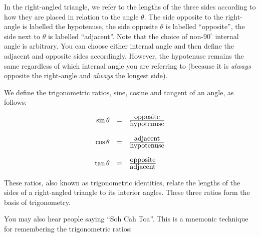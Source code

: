

In the right-angled triangle, we refer to the lengths of the three
sides according to how they are placed in relation to the angle
$\theta $. The side opposite to the right-angle is labelled the
hypotenuse, the side opposite $\theta $ is labelled ``opposite'', the
side next to $\theta $ is labelled ``adjacent''. Note that the choice
of non-$90^{\circ}$ internal angle is arbitrary. You can choose either
internal angle and then define the adjacent and opposite sides
accordingly. However, the hypotenuse remains the same regardless of
which internal angle you are referring to (because it is {\em always}
opposite the right-angle and {\em always} the longest side).

We define the trigonometric ratios, sine, cosine and tangent of an
angle, as follows:

\begin{equation*}
\begin{array}{ccc}\hfill \sin \theta & =& \frac{\mbox{opposite}}{\mbox{hypotenuse}}\hfill \\
\\
 \hfill \cos \theta & =& \frac{\mbox{adjacent}}{\mbox{hypotenuse}}\hfill \\
\\
 \hfill \tan \theta & =& \frac{\mbox{opposite}}{\mbox{adjacent}}\hfill 
\end{array}
\end{equation*}

These ratios, also known as trigonometric identities, relate the
lengths of the sides of a right-angled triangle to its interior
angles. These three ratios form the basis of trigonometry.


You may also hear people saying ``Soh Cah Toa''. This is a mnemonic
technique for remembering the trigonometric ratios:


